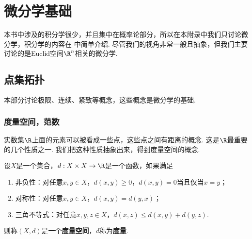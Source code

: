 \chapter{微分学基础}\label{chap:calculus}
本书中涉及的积分学很少，并且集中在概率论部分，所以在本附录中我们只讨论微分学，积分学的内容在 中简单介绍. 尽管我们的视角非常一般且抽象，但我们主要讨论的是Euclid空间$\R^n$相关的微分学. 

\section{点集拓扑}\label{sec:topology}
本部分讨论极限、连续、紧致等概念，这些概念是微分学的基础. 

\subsection{度量空间，范数}\label{subsec:metric-norm}
实数集$\R$上面的元素可以被看成一些点，这些点之间有距离的概念. 这是$\R$最重要的几个性质之一. 我们把这种性质抽象出来，得到度量空间的概念. 

\begin{definition}[度量空间]
设$X$是一个集合，$d:X\times X\to\R$是一个函数，如果满足
\begin{enumerate}
    \item 非负性：对任意$x,y\in X$，$d(x,y)\geq 0$，$d(x,y)=0$当且仅当$x=y$；
    \item 对称性：对任意$x,y\in X$，$d(x,y)=d(y,x)$；
    \item 三角不等式：对任意$x,y,z\in X$，$d(x,z)\leq d(x,y)+d(y,z)$. 
\end{enumerate}
则称$(X,d)$是一个\textbf{度量空间}，$d$称为\textbf{度量}. 
\end{definition}


